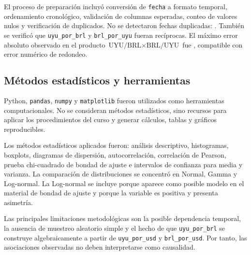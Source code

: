 El proceso de preparación incluyó conversión de \texttt{fecha} a formato temporal, ordenamiento cronológico, validación de columnas esperadas, conteo de valores nulos y verificación de duplicados. No se detectaron fechas duplicadas: \DuplicadosFecha{}. También se verificó que \texttt{uyu\_por\_brl} y \texttt{brl\_por\_uyu} fueran recíprocas. El máximo error absoluto observado en el producto \(\text{UYU/BRL}\times\text{BRL/UYU}\) fue \MaxErrorProductoInverso{}, compatible con error numérico de redondeo.

\subsection{Métodos estadísticos y herramientas}

Python, \texttt{pandas}, \texttt{numpy} y \texttt{matplotlib} fueron utilizados como herramientas computacionales. No se consideran métodos estadísticos, sino recursos para aplicar los procedimientos del curso y generar cálculos, tablas y gráficos reproducibles.

Los métodos estadísticos aplicados fueron: análisis descriptivo, histogramas, boxplots, diagramas de dispersión, autocorrelación, correlación de Pearson, prueba chi-cuadrado de bondad de ajuste e intervalos de confianza para media y varianza. La comparación de distribuciones se concentró en Normal, Gamma y Log-normal. La Log-normal se incluye porque aparece como posible modelo en el material de bondad de ajuste y porque la variable es positiva y presenta asimetría.

Las principales limitaciones metodológicas son la posible dependencia temporal, la ausencia de muestreo aleatorio simple y el hecho de que \texttt{uyu\_por\_brl} se construye algebraicamente a partir de \texttt{uyu\_por\_usd} y \texttt{brl\_por\_usd}. Por tanto, las asociaciones observadas no deben interpretarse como causalidad.

